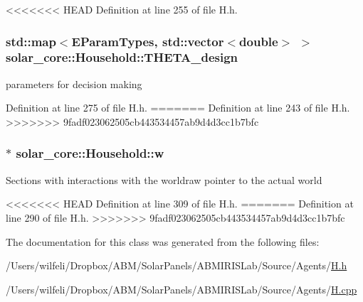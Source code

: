 <<<<<<< HEAD
Definition at line 255 of file H.\+h.

\hypertarget{classsolar__core_1_1_household_a7c0f5fb9f84a1d971e770fc677e7d8de}{}
\subsubsection[{T\+H\+E\+T\+A\+\_\+design}]{\setlength{\rightskip}{0pt plus 5cm}std\+::map$<${\bf E\+Param\+Types}, std\+::vector$<$double$>$ $>$ solar\+\_\+core\+::\+Household\+::\+T\+H\+E\+T\+A\+\_\+design\hspace{0.3cm}{\ttfamily [protected]}}\label{classsolar__core_1_1_household_a7c0f5fb9f84a1d971e770fc677e7d8de}
parameters for decision making 

Definition at line 275 of file H.\+h.
=======
Definition at line 243 of file H.\+h.
>>>>>>> 9fadf023062505cb443534457ab9d4d3cc1b7bfc

\hypertarget{classsolar__core_1_1_household_a01ac4643c725f397ba7485209a906e4d}{}
\subsubsection[{w}]{$\ast$ solar\+\_\+core\+::\+Household\+::w\hspace{0.3cm}{\ttfamily [protected]}}\label{classsolar__core_1_1_household_a01ac4643c725f397ba7485209a906e4d}
Sections with interactions with the worldraw pointer to the actual world 

<<<<<<< HEAD
Definition at line 309 of file H.\+h.
=======
Definition at line 290 of file H.\+h.
>>>>>>> 9fadf023062505cb443534457ab9d4d3cc1b7bfc



The documentation for this class was generated from the following files\+:\begin{DoxyCompactItemize}
\item 
/\+Users/wilfeli/\+Dropbox/\+A\+B\+M/\+Solar\+Panels/\+A\+B\+M\+I\+R\+I\+S\+Lab/\+Source/\+Agents/\hyperlink{_h_8h}{H.\+h}\item 
/\+Users/wilfeli/\+Dropbox/\+A\+B\+M/\+Solar\+Panels/\+A\+B\+M\+I\+R\+I\+S\+Lab/\+Source/\+Agents/\hyperlink{_h_8cpp}{H.\+cpp}\end{DoxyCompactItemize}
